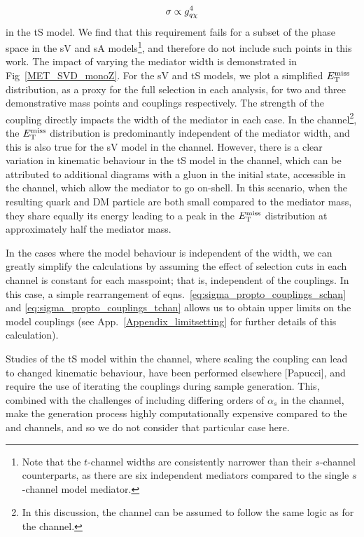 \begin{equation}
  \sigma \propto g_{q \chi}^4
  \label{eq:sigma_propto_couplings_tchan}
\end{equation}
in the tS model. We find that this requirement fails for a subset of the phase space in the sV and sA models\footnote{Note that the $t$-channel widths are consistently narrower than their $s$-channel counterparts,  as there are six independent mediators compared to the single $s$-channel model mediator.}, and therefore do not include such points in this work.
The impact of varying the mediator width is demonstrated in Fig~\ref{MET_SVD_monoZ}. For the sV and tS models, we plot a simplified $E_{\mathrm{T}}^{\mathrm{miss}}$ distribution, as a proxy for the full selection in each analysis, for two and three demonstrative mass points and couplings respectively.  The strength of the coupling directly impacts the width of the mediator in each case. In the \monoZ channel\footnote{In this discussion, the \monoWZ channel can be assumed to follow the same logic as for the \monoZ channel.}, the $E_{\mathrm{T}}^{\mathrm{miss}}$ distribution is predominantly independent of the mediator width, and this is also true for the sV model in the \monojet channel. However, there is a clear variation in kinematic behaviour in the tS model in the \monojet channel, which can be attributed to additional diagrams with a gluon in the initial state, accessible in the \monojet channel, which allow the mediator to go on-shell. In this scenario, when the resulting quark and DM particle are both small compared to the mediator mass, they share equally its energy leading to a peak in the $E_{\mathrm{T}}^{\mathrm{miss}}$ distribution at approximately half the mediator mass.

In the cases where the model behaviour is independent of the width, we can greatly simplify the calculations by assuming the effect of selection cuts in each channel is constant for each masspoint; that is, independent of the couplings. In this case, a simple rearrangement of eqns.~\ref{eq:sigma_propto_couplings_schan} and \ref{eq:sigma_propto_couplings_tchan} allows us to obtain upper limits on the model couplings (see App.~\ref{Appendix_limitsetting} for further details of this calculation).

Studies of the tS model within the \monojet channel, where scaling the coupling can lead to changed kinematic behaviour, have been performed elsewhere [Papucci], and require the use of iterating the couplings during sample generation. This, combined with the challenges of including differing orders of $\alpha_s$ in the \monojet channel, make the generation process highly computationally expensive compared to the \monoZ and \monoWZ channels, and so we do not consider that particular case here.

